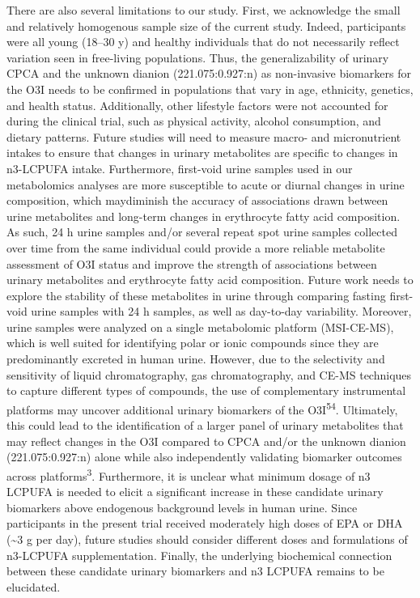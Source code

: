 \documentclass[journal=jacsat,manuscript=article]{achemso}
\begin{document}
There are also several limitations to our study. First, we acknowledge
the small and relatively homogenous sample size of the current study.
Indeed, participants were all young (18--30 y) and healthy individuals
that do not necessarily reflect variation seen in free-living
populations. Thus, the generalizability of urinary CPCA and the unknown
dianion (221.075:0.927:n) as non-invasive biomarkers for the O3I needs
to be confirmed in populations that vary in age, ethnicity, genetics,
and health status. Additionally, other lifestyle factors were not
accounted for during the clinical trial, such as physical activity,
alcohol consumption, and dietary patterns. Future studies will need to
measure macro- and micronutrient intakes to ensure that changes in
urinary metabolites are specific to changes in n3-LCPUFA intake.
Furthermore, first-void urine samples used in our metabolomics analyses
are more susceptible to acute or diurnal changes in urine composition,
which maydiminish the accuracy of associations drawn between urine
metabolites and long-term changes in erythrocyte fatty acid composition.
As such, 24 h urine samples and/or several repeat spot urine samples
collected over time from the same individual could provide a more
reliable metabolite assessment of O3I status and improve the strength of
associations between urinary metabolites and erythrocyte fatty acid
composition. Future work needs to explore the stability of these
metabolites in urine through comparing fasting first-void urine samples
with 24 h samples, as well as day-to-day variability. Moreover, urine
samples were analyzed on a single metabolomic platform (MSI-CE-MS),
which is well suited for identifying polar or ionic compounds since they
are predominantly excreted in human urine. However, due to the
selectivity and sensitivity of liquid chromatography, gas
chromatography, and CE-MS techniques to capture different types of
compounds, the use of complementary instrumental platforms may uncover
additional urinary biomarkers of the O3I\textsuperscript{54}.
Ultimately, this could lead to the identification of a larger panel of
urinary metabolites that may reflect changes in the O3I compared to CPCA
and/or the unknown dianion (221.075:0.927:n) alone while also
independently validating biomarker outcomes across
platforms\textsuperscript{3}. Furthermore, it is unclear what minimum
dosage of n3 LCPUFA is needed to elicit a significant increase in these
candidate urinary biomarkers above endogenous background levels in human
urine. Since participants in the present trial received moderately high
doses of EPA or DHA (\textasciitilde3 g per day), future studies should
consider different doses and formulations of n3-LCPUFA supplementation.
Finally, the underlying biochemical connection between these candidate
urinary biomarkers and n3 LCPUFA remains to be elucidated.
\end{document}
